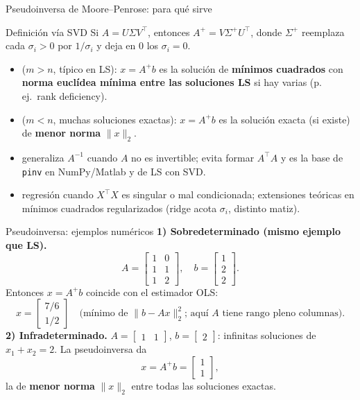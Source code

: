 \begin{frame}{Pseudoinversa de Moore--Penrose: para qué sirve}
\begin{block}{Definición vía SVD}
Si \(A=U\Sigma V^\top\), entonces \(A^+=V\Sigma^+U^\top\), donde \(\Sigma^+\) reemplaza cada \(\sigma_i>0\) por \(1/\sigma_i\) y deja en \(0\) los \(\sigma_i=0\).
\end{block}
\begin{itemize}\small
  \item {} (\(m>n\), típico en LS): \(x=A^+b\) es la solución de \textbf{mínimos cuadrados} con \textbf{norma euclídea mínima entre las soluciones LS} si hay varias (p.\,ej.\ rank deficiency).
  \item {} (\(m<n\), muchas soluciones exactas): \(x=A^+b\) es la solución exacta (si existe) de \textbf{menor norma} \(\|x\|_2\).
  \item {} generaliza \(A^{-1}\) cuando \(A\) no es invertible; evita formar \(A^\top A\) y es la base de \texttt{pinv} en NumPy/Matlab y de LS con SVD.
  \item {} regresión cuando \(X^\top X\) es singular o mal condicionada; extensiones teóricas en mínimos cuadrados regularizados (ridge acota \(\sigma_i\), distinto matiz).
\end{itemize}
\end{frame}

\begin{frame}{Pseudoinversa: ejemplos numéricos}
\textbf{1) Sobredeterminado (mismo ejemplo que LS).}
\[
  A=\begin{bmatrix}1&0\\1&1\\1&2\end{bmatrix},\quad
  b=\begin{bmatrix}1\\2\\2\end{bmatrix}.
\]
Entonces \(x=A^+b\) coincide con el estimador OLS:
\[
  x=\begin{bmatrix}7/6\\1/2\end{bmatrix}
  \quad\text{(mínimo de }\|b-Ax\|_2^2\text{; aquí \(A\) tiene rango pleno columnas).}
\]
\textbf{2) Infradeterminado.} \(A=\begin{bmatrix}1&1\end{bmatrix}\), \(b=\begin{bmatrix}2\end{bmatrix}\): infinitas soluciones de \(x_1+x_2=2\). La pseudoinversa da
\[
  x=A^+b=\begin{bmatrix}1\\1\end{bmatrix},
\]
la de \textbf{menor norma} \(\|x\|_2\) entre todas las soluciones exactas.
\end{frame}

